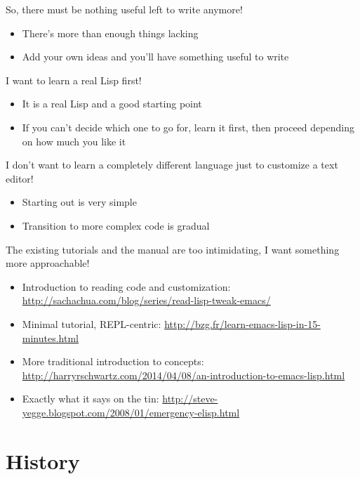 \documentclass[presentation]{beamer}
\begin{document}
\begin{frame}[label=sec-3-3]{So, there must be nothing useful left to write anymore!}
\begin{itemize}
\item There's more than enough things lacking
\item Add your own ideas and you'll have something useful to write
\end{itemize}
\end{frame}

\begin{frame}[label=sec-3-4]{I want to learn a real Lisp first!}
\begin{itemize}
\item It is a real Lisp and a good starting point
\item If you can't decide which one to go for, learn it first, then
proceed depending on how much you like it
\end{itemize}
\end{frame}

\begin{frame}[label=sec-3-5]{I don't want to learn a completely different language just to customize a text editor!}
\begin{itemize}
\item Starting out is very simple
\item Transition to more complex code is gradual
\end{itemize}
\end{frame}

\begin{frame}[label=sec-3-6]{The existing tutorials and the manual are too intimidating, I want something more approachable!}
\begin{itemize}
\item Introduction to reading code and customization:
\url{http://sachachua.com/blog/series/read-lisp-tweak-emacs/}
\item Minimal tutorial, REPL-centric:
\url{http://bzg.fr/learn-emacs-lisp-in-15-minutes.html}
\item More traditional introduction to concepts:
\url{http://harryrschwartz.com/2014/04/08/an-introduction-to-emacs-lisp.html}
\item Exactly what it says on the tin:
\url{http://steve-yegge.blogspot.com/2008/01/emergency-elisp.html}
\end{itemize}
\end{frame}

\section{History}
\label{sec-4}
\end{document}
